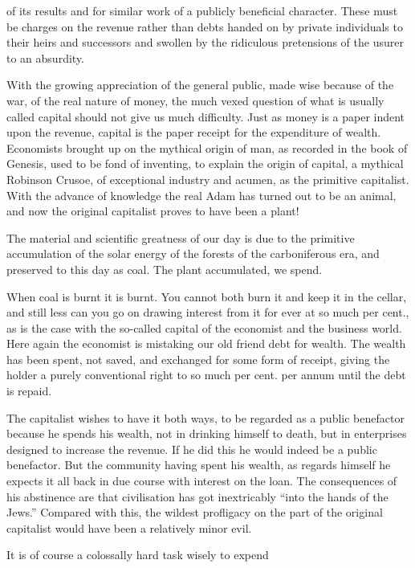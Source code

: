 \documentclass[10.5pt,twoside]{book}
\newcommand{\origpage}[1]{\clearpage\setcounter{page}{#1}}
\begin{document}
\origpage{25}

\noindent of its results and for similar work of a publicly beneficial
character. These must be charges on the revenue rather than debts handed on by
private individuals to their heirs and successors and swollen by the
ridiculous pretensions of the usurer to an absurdity.

With the growing appreciation of the general public, made wise because of the
war, of the real nature of money, the much vexed question of what is usually
called capital should not give us much difficulty. Just as money is a paper
indent upon the revenue, capital is the paper receipt for the expenditure of
wealth. Economists brought up on the mythical origin of man, as recorded in
the book of Genesis, used to be fond of inventing, to explain the origin of
capital, a mythical Robinson Crusoe, of exceptional industry and acumen, as
the primitive capitalist. With the advance of knowledge the real Adam has
turned out to be an animal, and now the original capitalist proves to have
been a plant!

The material and scientific greatness of our day is due to the primitive
accumulation of the solar energy of the forests of the carboniferous era, and
preserved to this day as coal. The plant accumulated, we spend.

When coal is burnt it is burnt. You cannot both burn it and keep it in the
cellar, and still less can you go on drawing interest from it for ever at so
much per cent., as is the case with the so-called capital of the economist and
the business world. Here again the economist is mistaking our old friend debt
for wealth. The wealth has been spent, not saved, and exchanged for some form
of receipt, giving the holder a purely conventional right to so much per cent.
per annum until the debt is repaid.

The capitalist wishes to have it both ways, to be regarded as a public
benefactor because he spends his wealth, not in drinking himself to death, but
in enterprises designed to increase the revenue. If he did this he would
indeed be a public benefactor. But the community having spent his wealth, as
regards himself he expects it all back in due course with interest on the
loan. The consequences of his abstinence are that civilisation has got
inextricably ``into the hands of the Jews.'' Compared with this, the wildest
profligacy on the part of the original capitalist would have been a relatively
minor evil.

It is of course a colossally hard task wisely to expend
\end{document}
